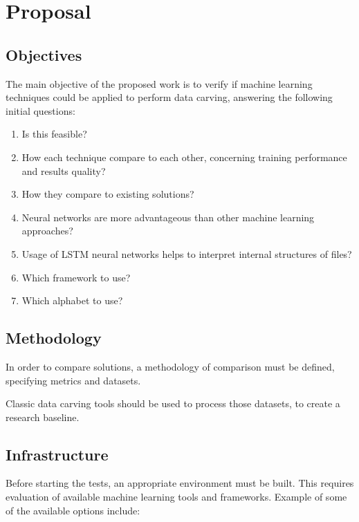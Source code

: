 \chapter{Proposal}
\section{Objectives}
The main objective of the proposed work is to verify if machine learning techniques could be applied to perform data carving, answering the following initial questions:


\begin{enumerate}[itemindent=\parindent,label=\textbf{Q\arabic*.}]
  \item Is this feasible?
  \item How each technique compare to each other, concerning training performance and results quality?
  \item How they compare to existing solutions?
  \item Neural networks are more advantageous than other machine learning approaches?
  \item Usage of LSTM neural networks helps to interpret internal structures of files?
  \item Which framework to use?
  \item Which alphabet to use?
\end{enumerate}

\section{Methodology}
In order to compare solutions, a methodology of comparison must be defined, specifying metrics and datasets.


Classic data carving tools should be used to process those datasets, to create a research baseline.

\section{Infrastructure}
Before starting the tests, an appropriate environment must be built. This requires evaluation of available machine learning tools and frameworks. Example of some of the available options include:

